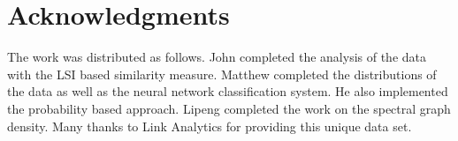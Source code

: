 \section{Acknowledgments}

The work was distributed as follows. John completed the analysis of the data with the LSI based similarity measure.
Matthew completed the distributions of the data as well as the neural network classification system. He also implemented the probability based approach.
Lipeng completed the work on the spectral graph density.
Many thanks to Link Analytics for providing this unique data set.
